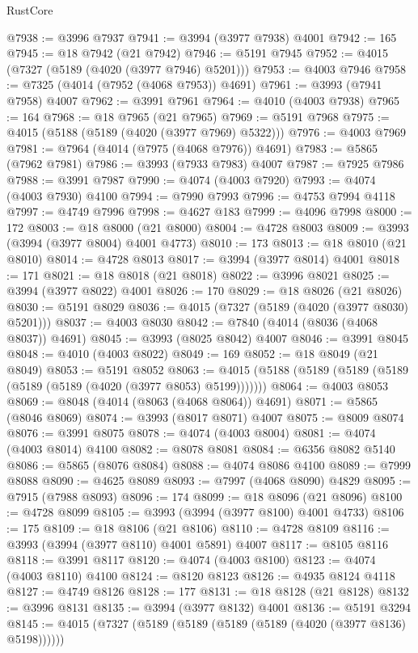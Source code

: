 \begin{lexlean}{RustCore}
\begin{coremodule}
@7938 := @3996 @7937
@7941 := @3994 (@3977 @7938) @4001
@7942 := 165
@7945 := @18 @7942 (@21 @7942)
@7946 := @5191 @7945
@7952 := @4015 (@7327 (@5189 (@4020 (@3977 @7946) @5201)))
@7953 := @4003 @7946
@7958 := @7325 (@4014 (@7952 (@4068 @7953)) @4691)
@7961 := @3993 (@7941 @7958) @4007
@7962 := @3991 @7961
@7964 := @4010 (@4003 @7938)
@7965 := 164
@7968 := @18 @7965 (@21 @7965)
@7969 := @5191 @7968
@7975 := @4015 (@5188 (@5189 (@4020 (@3977 @7969) @5322)))
@7976 := @4003 @7969
@7981 := @7964 (@4014 (@7975 (@4068 @7976)) @4691)
@7983 := @5865 (@7962 @7981)
@7986 := @3993 (@7933 @7983) @4007
@7987 := @7925 @7986
@7988 := @3991 @7987
@7990 := @4074 (@4003 @7920)
@7993 := @4074 (@4003 @7930) @4100
@7994 := @7990 @7993
@7996 := @4753 @7994 @4118
@7997 := @4749 @7996
@7998 := @4627 @183
@7999 := @4096 @7998
@8000 := 172
@8003 := @18 @8000 (@21 @8000)
@8004 := @4728 @8003
@8009 := @3993 (@3994 (@3977 @8004) @4001 @4773)
@8010 := 173
@8013 := @18 @8010 (@21 @8010)
@8014 := @4728 @8013
@8017 := @3994 (@3977 @8014) @4001
@8018 := 171
@8021 := @18 @8018 (@21 @8018)
@8022 := @3996 @8021
@8025 := @3994 (@3977 @8022) @4001
@8026 := 170
@8029 := @18 @8026 (@21 @8026)
@8030 := @5191 @8029
@8036 := @4015 (@7327 (@5189 (@4020 (@3977 @8030) @5201)))
@8037 := @4003 @8030
@8042 := @7840 (@4014 (@8036 (@4068 @8037)) @4691)
@8045 := @3993 (@8025 @8042) @4007
@8046 := @3991 @8045
@8048 := @4010 (@4003 @8022)
@8049 := 169
@8052 := @18 @8049 (@21 @8049)
@8053 := @5191 @8052
@8063 := @4015 (@5188 (@5189 (@5189 (@5189 (@5189 (@5189 (@4020 (@3977 @8053) @5199)))))))
@8064 := @4003 @8053
@8069 := @8048 (@4014 (@8063 (@4068 @8064)) @4691)
@8071 := @5865 (@8046 @8069)
@8074 := @3993 (@8017 @8071) @4007
@8075 := @8009 @8074
@8076 := @3991 @8075
@8078 := @4074 (@4003 @8004)
@8081 := @4074 (@4003 @8014) @4100
@8082 := @8078 @8081
@8084 := @6356 @8082 @5140
@8086 := @5865 (@8076 @8084)
@8088 := @4074 @8086 @4100
@8089 := @7999 @8088
@8090 := @4625 @8089
@8093 := @7997 (@4068 @8090) @4829
@8095 := @7915 (@7988 @8093)
@8096 := 174
@8099 := @18 @8096 (@21 @8096)
@8100 := @4728 @8099
@8105 := @3993 (@3994 (@3977 @8100) @4001 @4733)
@8106 := 175
@8109 := @18 @8106 (@21 @8106)
@8110 := @4728 @8109
@8116 := @3993 (@3994 (@3977 @8110) @4001 @5891) @4007
@8117 := @8105 @8116
@8118 := @3991 @8117
@8120 := @4074 (@4003 @8100)
@8123 := @4074 (@4003 @8110) @4100
@8124 := @8120 @8123
@8126 := @4935 @8124 @4118
@8127 := @4749 @8126
@8128 := 177
@8131 := @18 @8128 (@21 @8128)
@8132 := @3996 @8131
@8135 := @3994 (@3977 @8132) @4001
@8136 := @5191 @3294
@8145 := @4015 (@7327 (@5189 (@5189 (@5189 (@5189 (@4020 (@3977 @8136) @5198))))))

\end{coremodule}
\end{lexlean}

